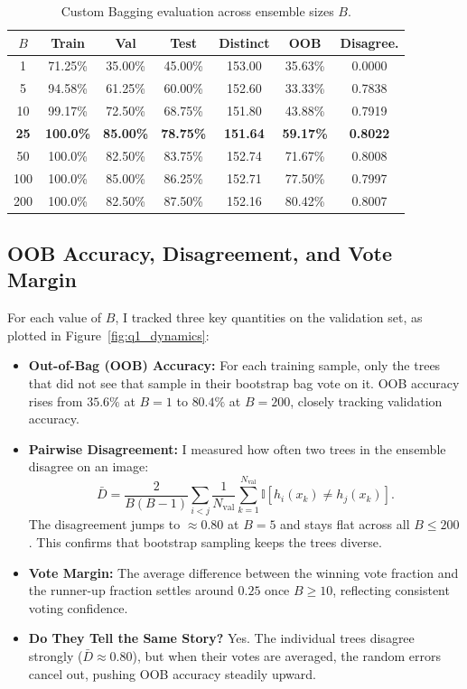 \documentclass[10pt,twocolumn,letterpaper]{article}
\begin{document}
\begin{table}[h]
\centering
\small
\caption{Custom Bagging evaluation across ensemble sizes $B$.}
\label{tab:q1_bagging}
\begin{tabular}{ccccccc}
\toprule
$B$ & Train & Val & Test & Distinct & OOB & Disagree. \\
\midrule
1   & 71.25\% & 35.00\% & 45.00\% & 153.00 & 35.63\% & 0.0000 \\
5   & 94.58\% & 61.25\% & 60.00\% & 152.60 & 33.33\% & 0.7838 \\
10  & 99.17\% & 72.50\% & 68.75\% & 151.80 & 43.88\% & 0.7919 \\
\textbf{25}  & \textbf{100.0\%} & \textbf{85.00\%} & \textbf{78.75\%} & \textbf{151.64} & \textbf{59.17\%} & \textbf{0.8022} \\
50  & 100.0\% & 82.50\% & 83.75\% & 152.74 & 71.67\% & 0.8008 \\
100 & 100.0\% & 85.00\% & 86.25\% & 152.71 & 77.50\% & 0.7997 \\
200 & 100.0\% & 82.50\% & 87.50\% & 152.16 & 80.42\% & 0.8007 \\
\bottomrule
\end{tabular}
\end{table}

\subsection{OOB Accuracy, Disagreement, and Vote Margin}
For each value of $B$, I tracked three key quantities on the validation set, as plotted in Figure~\ref{fig:q1_dynamics}:
\begin{itemize}[leftmargin=*]
    \item \textbf{Out-of-Bag (OOB) Accuracy:} For each training sample, only the trees that did not see that sample in their bootstrap bag vote on it. OOB accuracy rises from $35.6\%$ at $B=1$ to $80.4\%$ at $B=200$, closely tracking validation accuracy.
    \item \textbf{Pairwise Disagreement:} I measured how often two trees in the ensemble disagree on an image:
    \begin{equation}
        \bar{D} = \frac{2}{B(B-1)} \sum_{i < j} \frac{1}{N_{\text{val}}} \sum_{k=1}^{N_{\text{val}}} \mathbb{I}[h_i(x_k) \neq h_j(x_k)].
    \end{equation}
    The disagreement jumps to $\approx 0.80$ at $B=5$ and stays flat across all $B \le 200$. This confirms that bootstrap sampling keeps the trees diverse.
    \item \textbf{Vote Margin:} The average difference between the winning vote fraction and the runner-up fraction settles around $0.25$ once $B \ge 10$, reflecting consistent voting confidence.
    \item \textbf{Do They Tell the Same Story?} Yes. The individual trees disagree strongly ($\bar{D} \approx 0.80$), but when their votes are averaged, the random errors cancel out, pushing OOB accuracy steadily upward.
\end{itemize}
\end{document}
